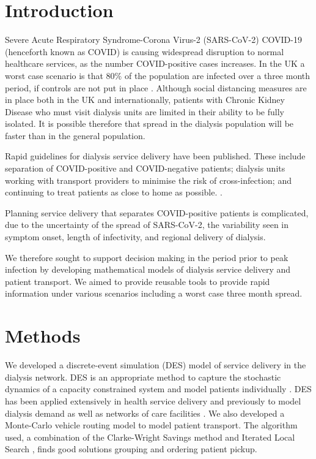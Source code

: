 


\begin{multicols}{2}

\section{Introduction}
Severe Acute Respiratory Syndrome-Corona Virus-2 (SARS-CoV-2) COVID-19 (henceforth known as COVID) is causing widespread disruption to normal healthcare services, as the number COVID-positive cases increases. In the UK a worst case scenario is that 80\% of the population are infected over a three month period, if controls are not put in place \cite{ferguson_impact_2020}. Although social distancing measures are in place both in the UK and internationally, patients with Chronic Kidney Disease  who must visit dialysis units are limited in their ability to be fully isolated. It is possible therefore that spread in the dialysis population will be faster than in the general population. 

Rapid guidelines for dialysis service delivery have been published\cite{nice_covid_mar_2020, Basile2020, KligerCJN.03340320}. These include separation of COVID-positive and COVID-negative patients; dialysis units working with transport providers to minimise the risk of cross-infection; and continuing to treat patients as close to home as possible. \cite{nice_covid_mar_2020}.

Planning service delivery that separates COVID-positive patients is complicated, due to the uncertainty of the spread of SARS-CoV-2, the variability seen in symptom onset, length of infectivity, and regional delivery of dialysis.  

We therefore sought to support decision making in the period prior to peak infection by developing mathematical models of dialysis service delivery and patient transport. We aimed to provide reusable tools to provide rapid information under various scenarios including a worst case three month spread.

\section{Methods}
We developed a discrete-event simulation (DES) model of service delivery in the dialysis network. DES is an appropriate method to capture the stochastic dynamics of a capacity constrained system and model patients individually \cite{currie2020}. DES has been applied extensively in health service delivery \cite{Pitt38, brailsford2009, Gunal2010, Mohiuddine015007} and previously to model dialysis demand \cite{roderick2004} as well as networks of care facilities \cite{allen2015}.  We also developed a Monte-Carlo vehicle routing model to model patient transport. The algorithm used, a combination of the Clarke-Wright Savings \cite{clarke_wright_1964} method and Iterated Local Search \cite{ils2003}, finds good solutions grouping and ordering patient pickup.


\end{multicols}
